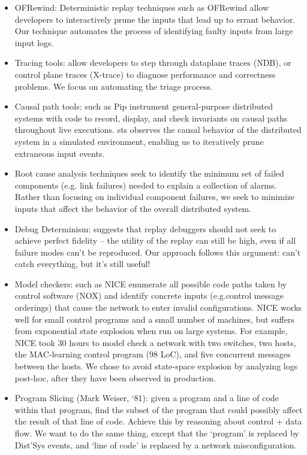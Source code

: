 \begin{itemize}
\item OFRewind: Deterministic replay techniques such as OFRewind allow developers to interactively prune the inputs that lead up to errant behavior. Our technique automates the process of identifying faulty inputs from large input logs.
\item Tracing tools: allow developers to step through dataplane traces (NDB), or control plane traces (X-trace) to diagnose performance and correctness problems. We focus on automating the triage process.
\item Causal path tools: such as Pip instrument general-purpose distributed systems
with code to record, display, and check invariants on causal paths throughout
live executions. sts observes the causal behavior of the
distributed system in a simulated environment, enabling us to iteratively prune extraneous input events.
\item Root cause analysis techniques seek to identify the minimum set of failed
components (e.g. link failures) needed to explain a collection of alarms. Rather than
focusing on individual component failures, we seek to minimize inputs that affect the behavior
of the overall distributed system.
\item Debug Determinism: suggests that replay debuggers should not seek to achieve perfect fidelity -- the utility of the replay can still be high, even if all failure modes can't be reproduced. Our approach follows this argument: can't catch everything, but it's still useful!
\end{itemize}


\begin{itemize}
\item Model checkers: such as NICE enumerate all possible code paths taken by control software (NOX)
and identify concrete inputs (e.g.control message orderings) that cause
the network to enter invalid configurations. NICE works well for small
control programs and a small number of machines, but suffers from exponential
state explosion when run on large systems. For example, NICE took 30 hours to
model check a network with two switches, two hosts, the MAC-learning
control program (98 LoC), and five concurrent
messages between the hosts. We chose to avoid state-space explosion by analyzing logs post-hoc, after they have been observed in production.
\item Program Slicing (Mark Weiser, ‘81): given a program and a line of code
within that program, find the subset of the program that could possibly affect
the result of that line of code. Achieve this by reasoning about control +
data flow. We want to do the same thing, except that the `program' is replaced
by Dist'Sys events, and `line of code' is replaced by a network misconfiguration.
\end{itemize}


